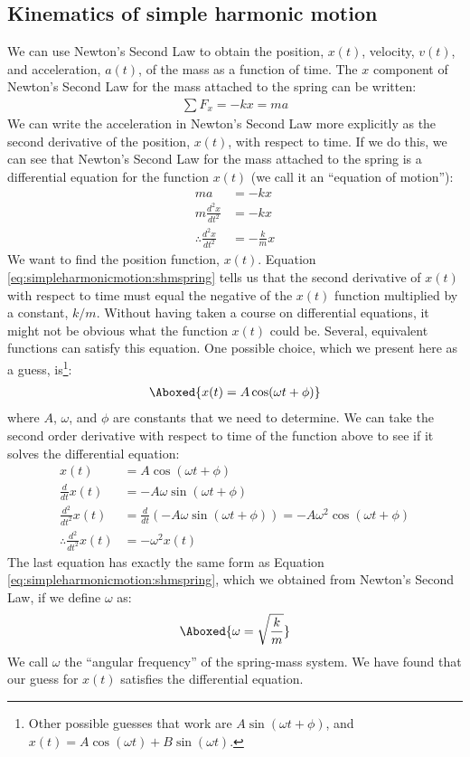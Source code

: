 \subsection{Kinematics of simple harmonic motion}
We can use Newton's Second Law to obtain the position, $x(t)$, velocity, $v(t)$, and acceleration, $a(t)$, of the mass as a function of time. The $x$ component of Newton's Second Law for the mass attached to the spring can be written:
\begin{align*}
\sum F_x = -kx = ma
\end{align*}
We can write the acceleration in Newton's Second Law more explicitly as the second derivative of the position, $x(t)$, with respect to time. If we do this, we can see that Newton's Second Law for the mass attached to the spring is a differential equation for the function $x(t)$ (we call it an ``equation of motion''):
\begin{align}
\label{eq:simpleharmonicmotion:shmspring}
ma &= -kx\nonumber\\
m\frac{d^2x}{dt^2} &= -kx\nonumber\\
\therefore \frac{d^2x}{dt^2} &= -\frac{k}{m}x
\end{align}
We want to find the position function, $x(t)$. Equation {\ref{eq:simpleharmonicmotion:shmspring}} tells us that the second derivative of $x(t)$ with respect to time must equal the negative of the $x(t)$ function multiplied by a constant, $k/m$. Without having taken a course on differential equations, it might not be obvious what the function $x(t)$ could be. Several, equivalent functions can satisfy this equation. One possible choice, which we present here as a guess, is\footnote{Other possible guesses that work are $A \sin(\omega t + \phi)$, and $x(t) = A\cos(\omega t) + B\sin(\omega t)$.}:
\begin{align}
\Aboxed{x(t) = A \cos(\omega t + \phi)}
\end{align}
where $A$, $\omega$, and $\phi$ are constants that we need to determine. We can take the second order derivative with respect to time of the function above to see if it solves the differential equation:
\begin{align*}
x(t) &= A \cos(\omega t + \phi)\\
\frac{d}{dt}x(t) &= -A\omega\sin(\omega t + \phi)\\
\frac{d^2}{dt^2}x(t) &=\frac{d}{dt}\left( -A\omega\sin(\omega t + \phi)\right)= -A\omega^2\cos(\omega t + \phi)\\
\therefore \frac{d^2}{dt^2}x(t) &= - \omega^2 x(t)
\end{align*}
The last equation has exactly the same form as Equation \ref{eq:simpleharmonicmotion:shmspring}, which we obtained from Newton's Second Law, if we define $\omega$ as:
\begin{align}
\Aboxed{\omega = \sqrt{\frac{k}{m}}}
\end{align}
We call $\omega$ the ``angular frequency'' of the spring-mass system. We have found that our guess for $x(t)$ satisfies the differential equation. 

